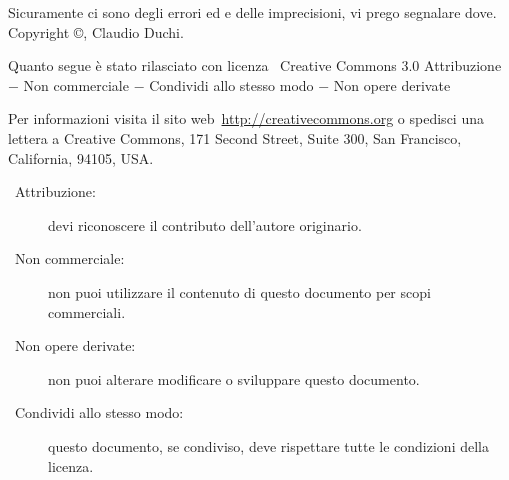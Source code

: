 Sicuramente ci sono degli errori ed e delle imprecisioni, vi  prego segnalare dove.
\vfill
Copyright \copyright\@ \the\year, Claudio Duchi.

Quanto segue è stato rilasciato con licenza \ccLogo\ Creative Commons   3.0 Attribuzione $-$ Non commerciale $-$ Condividi allo stesso modo $-$ Non opere derivate

Per informazioni visita il sito web\ \url{http://creativecommons.org} o spedisci una lettera a Creative Commons, 171 Second Street, Suite 300, San Francisco, California, 94105, USA.

\begin{description}
\item[\ccAttribution\ Attribuzione:] devi riconoscere il contributo dell'autore originario.
\item [\ccNonCommercial\ Non commerciale:] non puoi utilizzare il contenuto di questo documento per scopi commerciali.
\item [\ccNoDerivatives\ Non opere derivate:]  non puoi alterare modificare o sviluppare questo documento.
\item [\ccShareAlike\ Condividi allo stesso modo:]  questo documento, se condiviso, deve rispettare tutte le condizioni della licenza.
\end{description}

